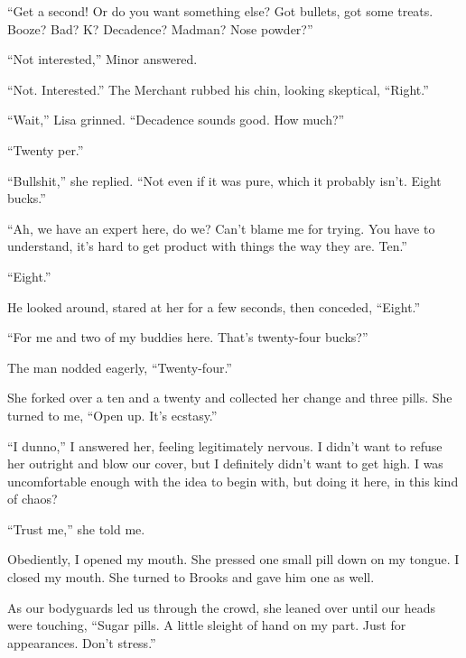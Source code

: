 ``Get a second!  Or do you want something else?  Got bullets, got some treats.  Booze?  Bad?  K?  Decadence?  Madman?  Nose powder?''



``Not interested,'' Minor answered.



``Not.  Interested.''  The Merchant rubbed his chin, looking skeptical, ``Right.''



``Wait,'' Lisa grinned.  ``Decadence sounds good.  How much?''



``Twenty per.''



``Bullshit,'' she replied.  ``Not even if it was pure, which it probably isn't.  Eight bucks.''



``Ah, we have an expert here, do we?  Can't blame me for trying.  You have to understand, it's hard to get product with things the way they are.  Ten.''



``Eight.''



He looked around, stared at her for a few seconds, then conceded, ``Eight.''



``For me and two of my buddies here.  That's twenty-four bucks?''



The man nodded eagerly, ``Twenty-four.''



She forked over a ten and a twenty and collected her change and three pills.  She turned to me, ``Open up.  It's ecstasy.''



``I dunno,'' I answered her, feeling legitimately nervous.  I didn't want to refuse her outright and blow our cover, but I definitely didn't want to get high.  I was uncomfortable enough with the idea to begin with, but doing it here, in this kind of chaos?



``Trust me,'' she told me.



Obediently, I opened my mouth.  She pressed one small pill down on my tongue.  I closed my mouth.  She turned to Brooks and gave him one as well.



As our bodyguards led us through the crowd, she leaned over until our heads were touching, ``Sugar pills.  A little sleight of hand on my part.  Just for appearances.  Don't stress.''



